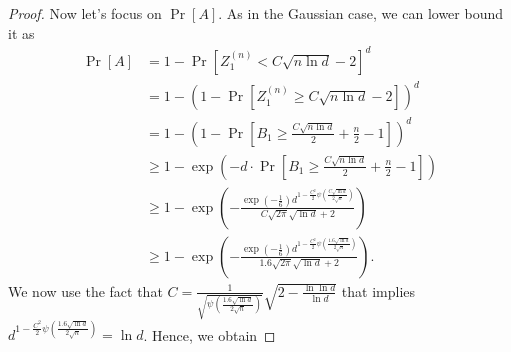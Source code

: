 \documentclass{article}
\begin{document}
\begin{proof}
Now let's focus on $\Pr[A]$. As in the Gaussian case, we can lower bound it as
\begin{align*}
\Pr[A]
& = 1 - \Pr \left[ Z^{(n)}_1 < C \sqrt{n \ln d} - 2 \right]^d \\
& = 1 - \left(1 - \Pr\left[Z^{(n)}_1\ge C \sqrt{n \ln d}-2 \right] \right)^d \\
& = 1 - \left(1 - \Pr\left[B_1 \ge \frac{C \sqrt{n \ln d}}{2} +\frac{n}{2} - 1 \right] \right)^d \\
& \ge 1-\exp\left(-d \cdot \Pr \left[ B_1\ge \frac{C \sqrt{n \ln d}}{2} +\frac{n}{2}-1 \right] \right) \\
& \ge 1 - \exp\left(-\frac{\exp\left(-\frac{1}{6}\right) d^{1-\frac{C^2}{2} \psi\left(\frac{C \sqrt{\ln d}}{2 \sqrt{n}}\right)}}{C \sqrt{2\pi} \sqrt{\ln d}+2}\right) \\
& \ge 1 - \exp\left(-\frac{\exp\left(-\frac{1}{6}\right) d^{1-\frac{C^2}{2} \psi\left(\frac{1.6 \sqrt{\ln d}}{2 \sqrt{n}}\right)}}{1.6 \sqrt{2\pi} \sqrt{\ln d}+2}\right).
%
\end{align*}
We now use the fact that $C=\frac{1}{\sqrt{\psi\left(\frac{1.6 \sqrt{\ln d}}{2 \sqrt{n}}\right)}}\sqrt{2- \frac{\ln \ln d}{\ln d}}$ that implies $d^{1-\frac{C^2}{2} \psi\left(\frac{1.6 \sqrt{\ln d}}{2 \sqrt{n}}\right)}=\ln d$. Hence, we obtain

\end{proof}
\end{document}
